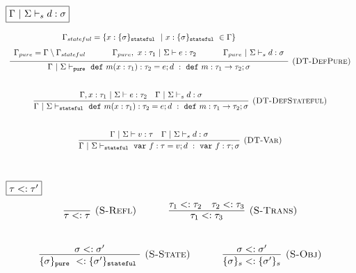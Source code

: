 \documentclass{llncs}
\newcommand{\keywadj}[1]{\mathtt{#1}}
\newcommand{\keyw}[1]{\keywadj{#1}~}
\begin{document}
$\fbox{$\Gamma~|~\Sigma \vdash_s d : \sigma$}$
\[
\begin{array}{c}

\infer[\textsc{(DT-DefPure)}]
  {\Gamma~|~\Sigma \vdash_{\keyw{pure}} \keyw{def} m(x : \tau_1) : \tau_2 = e; d~:~\keyw{def} m : \tau_1 \rightarrow \tau_2; \sigma}
  {\def\arraystretch{1.6}
  \begin{array}{c}
\Gamma_{stateful} = \{x : \{ \sigma \}_{\keyw{stateful}} ~|~ x : \{ \sigma \}_{\keyw{stateful}} \in \Gamma\} \\
\Gamma_{pure} = \Gamma \setminus \Gamma_{stateful}~~~~~~~~~~\Gamma_{pure},~x : \tau_1~|~\Sigma \vdash e : \tau_2~~~~~~~~~~\Gamma_{pure}~|~\Sigma \vdash_s d : \sigma
  \end{array}}\\[5ex]

\infer[\textsc{(DT-DefStateful)}]
  {\Gamma~|~\Sigma \vdash_{\keyw{stateful}} \keyw{def} m(x : \tau_1) : \tau_2 = e; d~:~\keyw{def} m : \tau_1 \rightarrow \tau_2; \sigma}
  {\Gamma, x : \tau_1~|~\Sigma \vdash e : \tau_2 & \Gamma~|~\Sigma \vdash_s d : \sigma}\\[5ex]

\infer[\textsc{(DT-Var)}]
  {\Gamma~|~\Sigma \vdash_{\keyw{stateful}} \keyw{var} f : \tau = v; d~:~\keyw{var} f : \tau; \sigma}
  {\Gamma~|~\Sigma \vdash v : \tau & \Gamma~|~\Sigma \vdash_s d : \sigma}\\[5ex]

\end{array}
\]

$\fbox{$\tau <: \tau'$}$
\[
\begin{array}{c}
\infer[\textsc{(S-Refl)}]
  {\tau <: \tau}
  {}%
~~~~~~~~~~
\infer[\textsc{(S-Trans)}]
  {\tau_1 <: \tau_3}
  {\tau_1 <: \tau_2 & \tau_2 <: \tau_3}\\[5ex]

\infer[\textsc{(S-State)}]
  {\{ \sigma \}_{\keyw{pure}} <: \{ \sigma' \}_{\keyw{stateful}}}
  {\sigma <: \sigma'}%
~~~~~~~~~~
\infer[\textsc{(S-Obj)}]
  {\{ \sigma \}_{s} <: \{ \sigma' \}_{s}}
  {\sigma <: \sigma'}\\[5ex]  

\end{array}
\]
\end{document}
